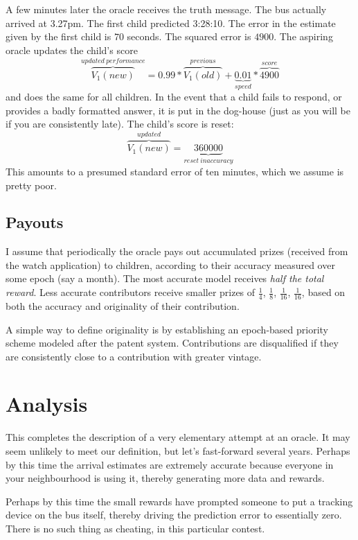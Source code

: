 A few minutes later the oracle receives the truth message. The bus actually arrived at 3.27pm. The first child predicted 3:28:10. The error in the estimate given by the first child is $70$ seconds. The squared error is $4900$. The aspiring oracle updates the child's score
$$
                \overbrace{V_1(new)}^{updated\ performance} = 0.99*\overbrace{V_1(old)}^{previous} + \underbrace{0.01}_{speed}*\overbrace{4900}^{score}
$$
and does the same for all children. In the event that a child fails to respond, or provides a badly formatted answer, it is put in the dog-house (just as you will be if you are consistently late). The child's score is reset:
$$
              \overbrace{V_1(new)}^{updated} = \underbrace{360000}_{reset\ inaccuracy}
$$
This amounts to a presumed standard error of ten minutes, which we assume is pretty poor.   

\subsection{Payouts}

I assume that periodically the oracle pays out accumulated prizes (received from the watch application) to children, according to their accuracy measured over some epoch (say a month). The most accurate model receives {\em half the total reward}. Less accurate contributors receive smaller prizes of $\frac{1}{4}$, $\frac{1}{8}$, $\frac{1}{16}$, $\frac{1}{16}$, based on both the accuracy and originality of their contribution. 

A simple way to define originality is by establishing an epoch-based priority scheme modeled after the patent system. Contributions are disqualified if they are consistently close to a contribution with greater vintage.  



\section{Analysis}

This completes the description of a very elementary attempt at an oracle. It may seem unlikely to meet our definition, but let's fast-forward several years. Perhaps by this time the arrival estimates are extremely accurate because everyone in your neighbourhood is using it, thereby generating more data and rewards. 

Perhaps by this time the small rewards have prompted someone to put a tracking device on the bus itself, thereby driving the prediction error to essentially zero. There is no such thing as cheating, in this particular contest. 

